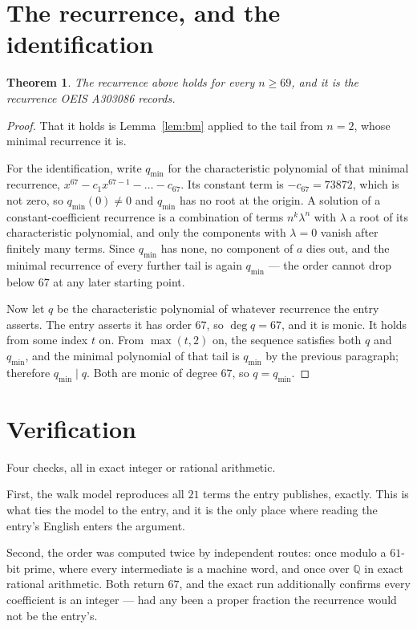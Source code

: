 \documentclass[11pt,a4paper]{article}
\theoremstyle{plain}
\newtheorem{theorem}{Theorem}
\theoremstyle{definition}
\begin{document}
\section{The recurrence, and the identification}

\begin{theorem}
The recurrence above holds for every $n\ge69$, and it is the recurrence OEIS A303086 records.
\end{theorem}

\begin{proof}
That it holds is Lemma~\ref{lem:bm} applied to the tail from $n=2$, whose minimal
recurrence it is.

For the identification, write $q_{\min}$ for the characteristic polynomial of that minimal
recurrence, $x^{67}-c_1x^{67-1}-\dots-c_{67}$. Its constant term is
$-c_{67}=73872$, which is not zero, so $q_{\min}(0)\neq0$ and $q_{\min}$ has no
root at the origin. A solution of a constant-coefficient recurrence is a combination of terms
$n^{k}\lambda^{n}$ with $\lambda$ a root of its characteristic polynomial, and only the
components with $\lambda=0$ vanish after finitely many terms. Since $q_{\min}$ has none, no
component of $a$ dies out, and the minimal recurrence of every further tail is again
$q_{\min}$ --- the order cannot drop below $67$ at any later starting point.

Now let $q$ be the characteristic polynomial of whatever recurrence the entry asserts. The
entry asserts it has order $67$, so $\deg q=67$, and it is monic. It holds from some
index $t$ on. From $\max(t,2)$ on, the sequence satisfies both $q$ and $q_{\min}$, and
the minimal polynomial of that tail is $q_{\min}$ by the previous paragraph; therefore
$q_{\min}\mid q$. Both are monic of degree $67$, so $q=q_{\min}$.
\end{proof}

\section{Verification}

Four checks, all in exact integer or rational arithmetic.

First, the walk model reproduces all $21$ terms the entry publishes, exactly. This is
what ties the model to the entry, and it is the only place where reading the entry's English
enters the argument.

Second, the order was computed twice by independent routes: once modulo a $61$-bit prime, where
every intermediate is a machine word, and once over $\mathbb{Q}$ in exact rational arithmetic.
Both return $67$, and the exact run additionally confirms every coefficient is an integer
--- had any been a proper fraction the recurrence would not be the entry's.
\end{document}

